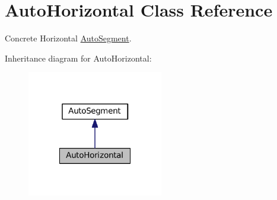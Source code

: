 \hypertarget{classKatabatic_1_1AutoHorizontal}{}\section{Auto\+Horizontal Class Reference}
\label{classKatabatic_1_1AutoHorizontal}


Concrete Horizontal \mbox{\hyperlink{classKatabatic_1_1AutoSegment}{Auto\+Segment}}.  




Inheritance diagram for Auto\+Horizontal\+:\nopagebreak
\begin{figure}[H]
\begin{center}
\leavevmode
\includegraphics[width=168pt]{classKatabatic_1_1AutoHorizontal__inherit__graph}
\end{center}
\end{figure}
